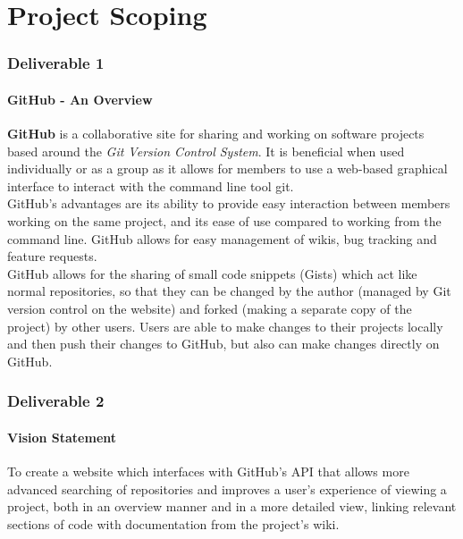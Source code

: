 \documentclass[12pt]{article}
\begin{document}
\part{Project Scoping}
\setcounter{section}{1}
\setcounter{subsection}{0}
\section*{Deliverable 1}
\subsection{GitHub - An Overview}
\textbf{\textsf{GitHub}} is a collaborative site for sharing and working on software projects based around the \textit{Git Version Control System}. It is beneficial when used individually or as a group as it allows for members to use a web-based graphical interface to interact with the command line tool git.\\ 

\noindent \textsf{GitHub}'s advantages are its ability to provide easy interaction between members working on the same project, and its ease of use compared to working from the command line. \textsf{GitHub} allows for easy management of wikis, bug tracking and feature requests.\\

\noindent \textsf{GitHub} allows for the sharing of small code snippets (Gists) which act like normal repositories, so that they can be changed by the author (managed by Git version control on the website) and forked (making a separate copy of the project) by other users. Users are able to make changes to their projects locally and then push their changes to \textsf{GitHub}, but also can make changes directly on \textsf{GitHub}.


\setcounter{section}{2}
\setcounter{subsection}{0}
\section*{Deliverable 2}
\subsection{Vision Statement}
To create a website which interfaces with \textsf{GitHub}'s API that allows more advanced searching of repositories and improves a user's experience of viewing a project, both in an overview manner and in a more detailed view, linking relevant sections of code with documentation from the project's wiki.
\end{document}
